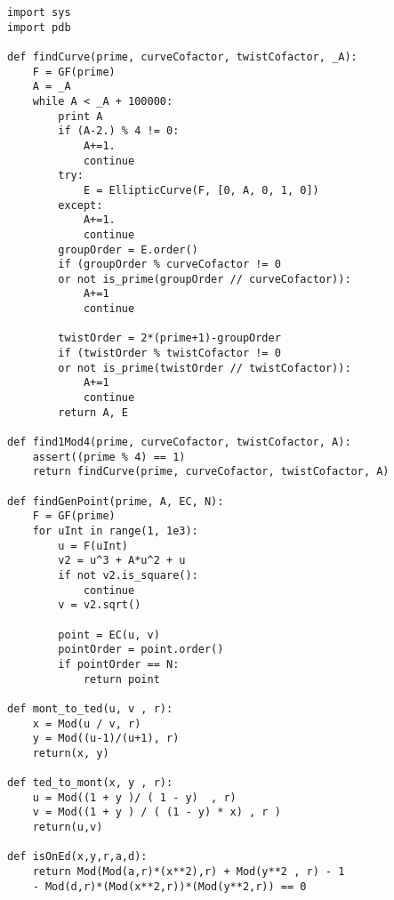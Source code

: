 \begin{lstlisting}
import sys
import pdb

def findCurve(prime, curveCofactor, twistCofactor, _A):
	F = GF(prime)
	A = _A
	while A < _A + 100000:
		print A
		if (A-2.) % 4 != 0:
			A+=1.
			continue
		try:
			E = EllipticCurve(F, [0, A, 0, 1, 0])
		except:
			A+=1.
			continue
		groupOrder = E.order()
		if (groupOrder % curveCofactor != 0
		or not is_prime(groupOrder // curveCofactor)):
			A+=1
			continue

		twistOrder = 2*(prime+1)-groupOrder
		if (twistOrder % twistCofactor != 0
		or not is_prime(twistOrder // twistCofactor)):
			A+=1
			continue
		return A, E

def find1Mod4(prime, curveCofactor, twistCofactor, A):
	assert((prime % 4) == 1)
	return findCurve(prime, curveCofactor, twistCofactor, A)

def findGenPoint(prime, A, EC, N):
	F = GF(prime)
	for uInt in range(1, 1e3):
		u = F(uInt)
		v2 = u^3 + A*u^2 + u
		if not v2.is_square():
			continue
		v = v2.sqrt()
	
		point = EC(u, v)
		pointOrder = point.order()
		if pointOrder == N:
			return point

def mont_to_ted(u, v , r):
	x = Mod(u / v, r) 
	y = Mod((u-1)/(u+1), r) 
	return(x, y)

def ted_to_mont(x, y , r):
	u = Mod((1 + y )/ ( 1 - y)  , r)
	v = Mod((1 + y ) / ( (1 - y) * x) , r ) 
	return(u,v)

def isOnEd(x,y,r,a,d):
	return Mod(Mod(a,r)*(x**2),r) + Mod(y**2 , r) - 1 
	- Mod(d,r)*(Mod(x**2,r))*(Mod(y**2,r)) == 0 
\end{lstlisting}
